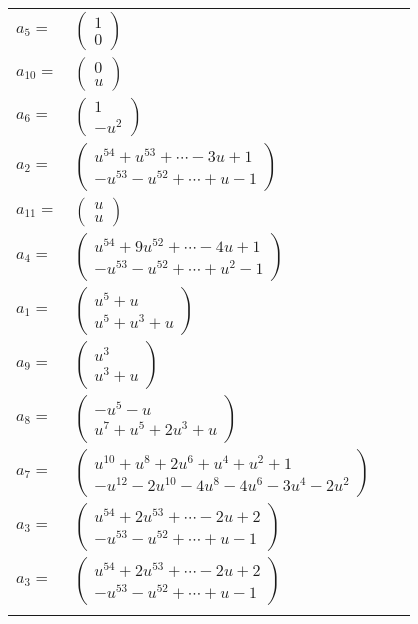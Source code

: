 \documentclass[1p]{elsarticle_modified}
\theoremstyle{definition}
\begin{document}
\begin{tabular}{m{7pt} m{180pt} m{7pt} m{180pt} }
\flushright $a_{5}=$&$\begin{pmatrix}1\\0\end{pmatrix}$ \\
\flushright $a_{10}=$&$\begin{pmatrix}0\\u\end{pmatrix}$ \\
\flushright $a_{6}=$&$\begin{pmatrix}1\\- u^2\end{pmatrix}$ \\
\flushright $a_{2}=$&$\begin{pmatrix}u^{54}+u^{53}+\cdots-3 u+1\\- u^{53}- u^{52}+\cdots+u-1\end{pmatrix}$ \\
\flushright $a_{11}=$&$\begin{pmatrix}u\\u\end{pmatrix}$ \\
\flushright $a_{4}=$&$\begin{pmatrix}u^{54}+9 u^{52}+\cdots-4 u+1\\- u^{53}- u^{52}+\cdots+u^2-1\end{pmatrix}$ \\
\flushright $a_{1}=$&$\begin{pmatrix}u^5+u\\u^5+u^3+u\end{pmatrix}$ \\
\flushright $a_{9}=$&$\begin{pmatrix}u^3\\u^3+u\end{pmatrix}$ \\
\flushright $a_{8}=$&$\begin{pmatrix}- u^5- u\\u^7+u^5+2 u^3+u\end{pmatrix}$ \\
\flushright $a_{7}=$&$\begin{pmatrix}u^{10}+u^8+2 u^6+u^4+u^2+1\\- u^{12}-2 u^{10}-4 u^8-4 u^6-3 u^4-2 u^2\end{pmatrix}$ \\
\flushright $a_{3}=$&$\begin{pmatrix}u^{54}+2 u^{53}+\cdots-2 u+2\\- u^{53}- u^{52}+\cdots+u-1\end{pmatrix}$\\ \flushright $a_{3}=$&$\begin{pmatrix}u^{54}+2 u^{53}+\cdots-2 u+2\\- u^{53}- u^{52}+\cdots+u-1\end{pmatrix}$\\&\end{tabular}
\end{document}
